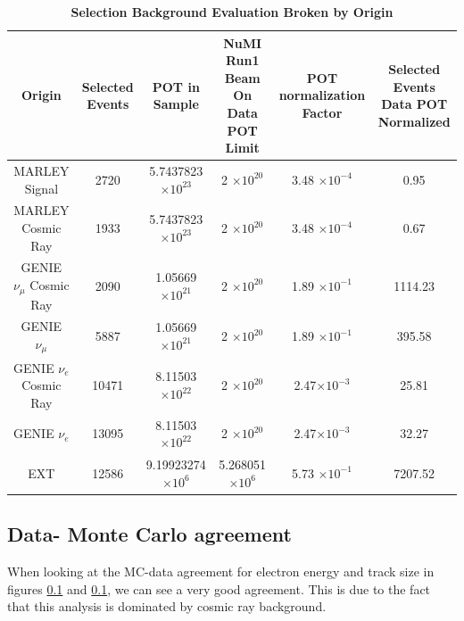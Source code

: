 \begin{table}
    \centering
	\begin{tabular}{cccccc}
		\hline
		\textbf{Origin} & \textbf{Selected Events}	&	\textbf{POT in Sample}	&	\textbf{NuMI Run1 Beam On Data POT Limit} & \textbf{POT normalization Factor} & \textbf{Selected Events Data POT Normalized}\\
		\toprule
		MARLEY Signal & 2720 & 5.7437823 $\times 10^{23}$ & 2 $\times 10^{20}$ & 3.48 $\times 10^{-4}$ & 0.95 \\ 
		MARLEY Cosmic Ray & 1933 & 5.7437823 $\times 10^{23}$ & 2 $\times 10^{20}$ & 3.48 $\times 10^{-4}$ & 0.67 \\
		GENIE  $\nu_{\mu}$ Cosmic Ray &  2090  &  1.05669 $\times 10^{21}$  &  2 $\times 10^{20}$ &  1.89 $\times 10^{-1}$ & 1114.23 \\ 
        GENIE  $\nu_{\mu}$ & 5887 & 1.05669 $\times 10^{21}$ & 2 $\times 10^{20}$ & 1.89 $\times 10^{-1}$ & 395.58 \\
        GENIE  $\nu_{e}$ Cosmic Ray & 10471 & 8.11503 $\times 10^{22}$ & 2 $\times 10^{20}$ & 2.47$\times 10^{-3}$ & 25.81 \\
        GENIE  $\nu_{e}$ & 13095 & 8.11503 $\times 10^{22}$ & 2 $\times 10^{20}$ & 2.47$\times 10^{-3}$ & 32.27 \\
        EXT & 12586 & 9.19923274 $\times 10^{6}$ & 5.268051 $\times 10^{6}$ & 5.73 $\times 10^{-1}$ & 7207.52 \\
		\hline
	\end{tabular}
	\caption[Selection Background Evaluation]{{\textbf{Selection Background Evaluation Broken by Origin}}}
    \label{bkg}
\end{table}

\subsection{Data- Monte Carlo agreement}
When looking at the MC-data agreement for electron energy and track size in figures \ref{} and \ref{}, we can see a very good agreement. This is due to the fact that this analysis is dominated by cosmic ray background.

